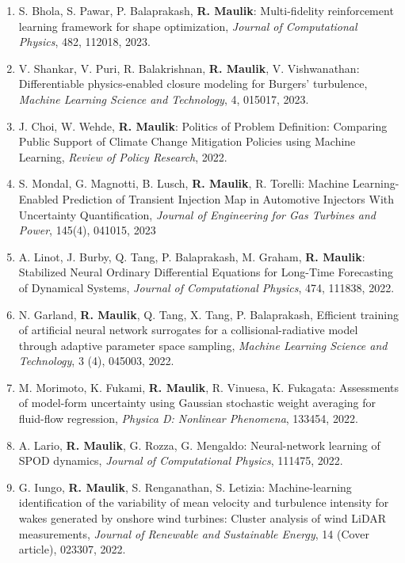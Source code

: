 \documentclass[letterpaper]{article}
\begin{document}
\begin{enumerate}
\item S. Bhola, S. Pawar, P. Balaprakash, \textbf{R. Maulik}: Multi-fidelity reinforcement learning framework for shape optimization, {\it Journal of Computational Physics}, 482, 112018, 2023.

\item V. Shankar, V. Puri, R. Balakrishnan, \textbf{R. Maulik}, V. Vishwanathan: Differentiable physics-enabled closure modeling for Burgers' turbulence, {\it Machine Learning Science and Technology}, 4, 015017, 2023.

\item J. Choi, W. Wehde, \textbf{R. Maulik}: Politics of Problem Definition: Comparing Public Support of Climate Change Mitigation Policies using Machine Learning, {\it Review of Policy Research}, 2022.

\item S. Mondal, G. Magnotti, B. Lusch, \textbf{R. Maulik}, R. Torelli: Machine Learning-Enabled Prediction of Transient Injection Map in Automotive Injectors With Uncertainty Quantification, {\it Journal of Engineering for Gas Turbines and Power}, 145(4), 041015, 2023

\item A. Linot, J. Burby, Q. Tang, P. Balaprakash, M. Graham, \textbf{R. Maulik}: Stabilized Neural Ordinary Differential Equations for Long-Time Forecasting of Dynamical Systems, {\it Journal of Computational Physics}, 474, 111838, 2022.

\item N. Garland, \textbf{R. Maulik}, Q. Tang, X. Tang, P. Balaprakash, Efficient training of artificial neural network surrogates for a collisional-radiative model through adaptive parameter space sampling, {\it Machine Learning Science and Technology}, 3 (4), 045003, 2022.

\item M. Morimoto, K. Fukami, \textbf{R. Maulik}, R. Vinuesa, K. Fukagata: Assessments of model-form uncertainty using Gaussian stochastic weight averaging for fluid-flow regression, {\it Physica D: Nonlinear Phenomena}, 133454, 2022.

\item A. Lario, \textbf{R. Maulik}, G. Rozza, G. Mengaldo: Neural-network learning of SPOD dynamics, {\it Journal of Computational Physics}, 111475, 2022.

\item G. Iungo, \textbf{R. Maulik}, S. Renganathan, S. Letizia: Machine-learning identification of the variability of mean velocity and turbulence intensity for wakes generated by onshore wind turbines: Cluster analysis of wind LiDAR measurements, {\it Journal of Renewable and Sustainable Energy}, 14 (Cover article), 023307, 2022.


\end{enumerate}
\end{document}
